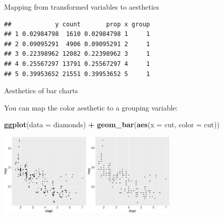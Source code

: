 \documentclass[ignorenonframetext,]{beamer}
\newenvironment{Shaded}{\begin{snugshade}}{\end{snugshade}}
\newcommand{\DataTypeTok}[1]{\textcolor[rgb]{0.13,0.29,0.53}{#1}}
\newcommand{\DecValTok}[1]{\textcolor[rgb]{0.00,0.00,0.81}{#1}}
\newcommand{\KeywordTok}[1]{\textcolor[rgb]{0.13,0.29,0.53}{\textbf{#1}}}
\newcommand{\NormalTok}[1]{#1}
\newcommand{\OperatorTok}[1]{\textcolor[rgb]{0.81,0.36,0.00}{\textbf{#1}}}
\newcommand{\StringTok}[1]{\textcolor[rgb]{0.31,0.60,0.02}{#1}}
\begin{document}
\begin{frame}[fragile]{Mapping from transformed variables to aesthetics}
\protect\hypertarget{mapping-from-transformed-variables-to-aesthetics-5}{}

\begin{Shaded}
\end{Shaded}

\begin{verbatim}
##            y count       prop x group
## 1 0.02984798  1610 0.02984798 1     1
## 2 0.09095291  4906 0.09095291 2     1
## 3 0.22398962 12082 0.22398962 3     1
## 4 0.25567297 13791 0.25567297 4     1
## 5 0.39953652 21551 0.39953652 5     1
\end{verbatim}

\end{frame}

\begin{frame}[fragile]{Aesthetics of bar charts}
\protect\hypertarget{aesthetics-of-bar-charts}{}

You can map the color aesthetic to a grouping variable:

\begin{Shaded}
\begin{Highlighting}[]
\KeywordTok{ggplot}\NormalTok{(}\DataTypeTok{data =}\NormalTok{ diamonds) }\OperatorTok{+}\StringTok{ }
\StringTok{  }\KeywordTok{geom_bar}\NormalTok{(}\KeywordTok{aes}\NormalTok{(}\DataTypeTok{x =}\NormalTok{ cut, }\DataTypeTok{color =}\NormalTok{ cut))}
\end{Highlighting}
\end{Shaded}

\begin{center}\includegraphics[height=150px]{data-visualization_files/figure-beamer/unnamed-chunk-132-1} \end{center}

\end{frame}
\end{document}
